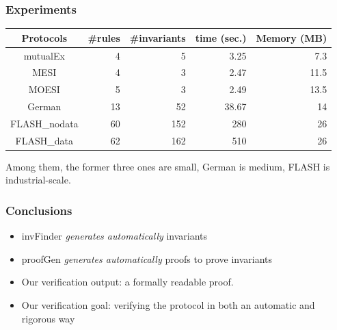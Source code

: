 \documentclass{beamer}
\begin{document}
\begin{frame}\frametitle{Experiments}
\begin{table}[!t]
\centering
\vspace{-8pt}
\begin{tabular}{|c|r|r|r|r|}
\hline
Protocols &  \#rules & \#invariants & time (sec.) & Memory (MB) \\
\hline\hline
mutualEx & 4& 5 & 3.25 & 7.3  \\
\hline
MESI & 4& 3 & 2.47 & 11.5  \\
\hline
MOESI &  5& 3 &2.49 & 13.5  \\
\hline
German  & 13 & 52 & 38.67 & 14  \\
\hline
FLASH\_nodata & 60 & 152 & 280 & 26  \\
\hline
FLASH\_data & 62 & 162 & 510 & 26  \\
\hline
\end{tabular}
\end{table}

Among them, the former three ones are small, German is medium, FLASH is industrial-scale.
\end{frame}

\begin{frame}\frametitle{Conclusions}

\begin{itemize}
\item   {\sf invFinder}   \emph{generates automatically }  invariants 

\item   {\sf proofGen}     \emph{generates automatically } proofs to prove invariants
 
 \item Our verification output: a formally readable proof. 
 
 \item  Our verification goal:  verifying the protocol in both an automatic and rigorous way
\end{itemize}    
\end{frame}
\end{document}
